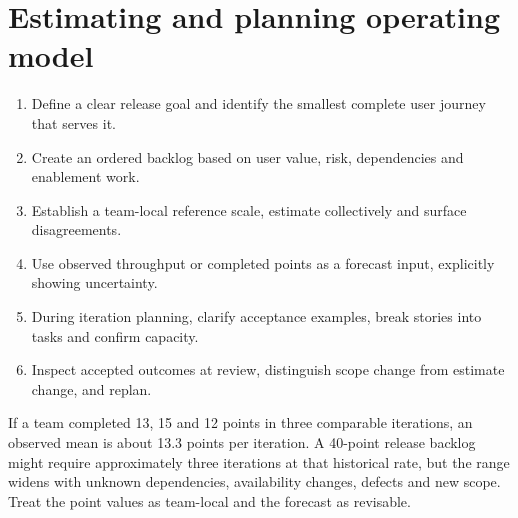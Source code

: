 \documentclass[11pt,letterpaper]{article}
\begin{document}
\section{Estimating and planning operating model}
\begin{enumerate}[leftmargin=*,itemsep=3pt]
\item Define a clear release goal and identify the smallest complete user journey that serves it.
\item Create an ordered backlog based on user value, risk, dependencies and enablement work.
\item Establish a team-local reference scale, estimate collectively and surface disagreements.
\item Use observed throughput or completed points as a forecast input, explicitly showing uncertainty.
\item During iteration planning, clarify acceptance examples, break stories into tasks and confirm capacity.
\item Inspect accepted outcomes at review, distinguish scope change from estimate change, and replan.
\end{enumerate}
\begin{tcolorbox}[colback=tealback,colframe=navy,title={Illustrative forecast (not a commitment)},breakable]
If a team completed 13, 15 and 12 points in three comparable iterations, an observed mean is about 13.3 points per iteration. A 40-point release backlog might require approximately three iterations at that historical rate, but the range widens with unknown dependencies, availability changes, defects and new scope. Treat the point values as team-local and the forecast as revisable.

\end{tcolorbox}
\end{document}
